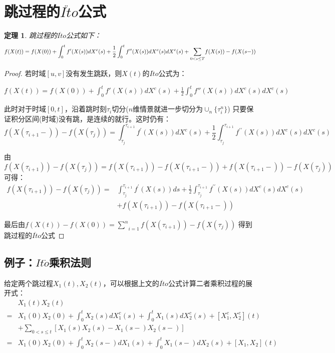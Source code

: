 \documentclass[a4paper, 12pt]{ctexart}
\newtheorem*{theorem}{定理}
\begin{document}
\section{跳过程的$I\ddot{t}o$公式}
\begin{theorem}
    跳过程的$I\ddot{t}o$公式如下：
$$\begin{small}
    f(X(t)) =f(X(0))+\int_0^tf'(X(s))dX^c(s)+\frac{1}{2}\int_0^tf''(X(s))dX^c(s)dX^c(s)+\underset{{0<s\leq T}}{\sum}f(X(s))-f(X(s-))
\end{small}$$
\end{theorem}

\begin{proof}
    若时域$[u,v]$没有发生跳跃，则$X(t)$的$I\ddot{t}o$公式为：

    $f(X(t)) =f(X(0))+\int_0^tf'(X(s))dX^c(s)+\frac{1}{2}\int_0^tf''(X(s))dX^c(s)dX^c(s)$

    此时对于时域$[0,t]$，沿着跳时刻${\tau_{i}}$切分($n$维情景就进一步切分为$\cup_{n}\{ \tau^n_{i}\}$)
    只要保证积分区间(时域)没有跳，是连续的就行。这时仍有：
    $$f(X(\tau _{i+1}-))-f(X(\tau _{j}))=\int_{\tau _{j}}^{\tau _{i+1}}f^{\prime }(X(s))dX^{c}(s)+\frac{1}{2}\int_{\tau _{j}}^{\tau _{i+1}}f^{\prime \prime }(X(s))dX^{c}(s)dX^{c}(s)$$
    
    由$f(X(\tau _{i+1}))-f(X(\tau _{j}))  =f(X(\tau _{i+1}))-f(X(\tau _{i+1}-))+f(X(\tau _{i+1}-))-f(X(\tau _{j}))$可得：
    \begin{align*}
        f(X(\tau _{i+1}))-f(X(\tau _{j}))  =&\int_{\tau _{j}}^{\tau _{i+1}}f^{\prime }(X(s))ds+\frac{1}{2}\int_{\tau _{j}}^{\tau _{i+1}}f^{\prime \prime }(X(s))dX^{c}(s)dX^{c}(s) \\[0.5mm]
    &+f(X(\tau _{i+1})) -f(X(\tau _{i+1}-)) \end{align*}

    最后由$f(X(t))-f(X(0))=\underset{ i=1 }{ \overset{ n }{ \sum } } f(X(\tau _{i+1}))-f(X(\tau _{j}))$
    得到跳过程的$I\ddot{t}o$公式

\end{proof}

\subsection{例子：$It \ddot{o}$乘积法则}
给定两个跳过程$X_1 (t),X_2 (t)$，可以根据上文的$I\ddot{t}o$公式计算二者乘积过程的展开式：
\begin{align*}
    &X_1(t)X_2(t) \\
    =&X_1(0)X_2(0)+\int_0^tX_2(s)dX_1^c(s)+\int_0^tX_1(s)dX_2^c(s)+\left[X_1^c,X_2^c\right](t) \\
    &+\sum_{0<s\leq t}\left[X_1(s)X_2(s)-X_1(s-)X_2(s-)\right] \\
    =&X_1(0)X_2(0)+\int_0^tX_2(s-)dX_1(s)+\int_0^tX_1(s-)dX_2(s)+\left[X_1,X_2\right](t)
\end{align*}
\end{document}
